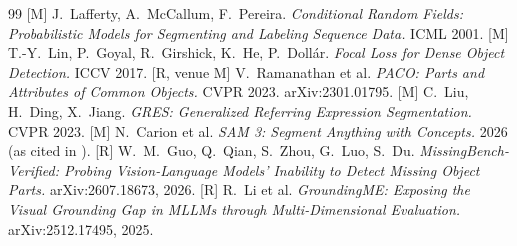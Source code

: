 \documentclass[11pt,a4paper]{article}
\theoremstyle{definition}
\theoremstyle{remark}
\begin{document}
\begin{thebibliography}{99}
 [M] J.~Lafferty, A.~McCallum, F.~Pereira. \emph{Conditional Random Fields: Probabilistic Models for
Segmenting and Labeling Sequence Data.} ICML 2001.
 [M] T.-Y.~Lin, P.~Goyal, R.~Girshick, K.~He, P.~Doll\'ar. \emph{Focal Loss for Dense Object
Detection.} ICCV 2017.
 [R, venue M] V.~Ramanathan et al. \emph{PACO: Parts and Attributes of Common Objects.} CVPR 2023.
arXiv:2301.01795.
 [M] C.~Liu, H.~Ding, X.~Jiang. \emph{GRES: Generalized Referring Expression Segmentation.} CVPR 2023.
 [M] N.~Carion et al. \emph{SAM 3: Segment Anything with Concepts.} 2026 (as cited in \cite{add}).
 [R] W.~M.~Guo, Q.~Qian, S.~Zhou, G.~Luo, S.~Du. \emph{MissingBench-Verified: Probing
Vision-Language Models' Inability to Detect Missing Object Parts.} arXiv:2607.18673, 2026.
 [R] R.~Li et al. \emph{GroundingME: Exposing the Visual Grounding Gap in MLLMs through
Multi-Dimensional Evaluation.} arXiv:2512.17495, 2025.
\end{thebibliography}
\end{document}
